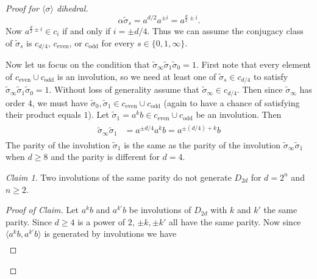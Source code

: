 \documentclass{dcthesis}
\newcommand{\wt}[1]{\widetilde{#1}}
\numberwithin{equation}{section}
\theoremstyle{definition}
\theoremstyle{remark}
\newtheorem*{claim}{Claim}
\begin{document}
{{\begin{proof}[Proof for $\langle\sigma\rangle$ dihedral]
\begin{equation}
        \alpha\wt{\sigma}_s
        =a^{d/2}a^{\pm i}=a^{\frac{d}{2}\pm i}.
      \end{equation}
      Now $a^{\frac{d}{2}\pm i}\in c_i$
      if and only if
      $i=\pm d/4$.
      Thus we can assume the conjugacy class of
      $\wt{\sigma}_s$
      is $c_{d/4}$,
      $c_\text{even}$, or
      $c_\text{odd}$
      for every $s\in \{0,1,\infty\}$.
      \par
      Now let us focus on the condition that
      $\wt{\sigma}_\infty\wt{\sigma}_1
      \wt{\sigma}_0=1$.
      First note that
      every element of
      $c_\text{even}\cup c_\text{odd}$
      is an involution, so we need
      at least one of $\wt{\sigma}_s\in c_{d/4}$
      to satisfy
      $\wt{\sigma}_\infty\wt{\sigma}_1
      \wt{\sigma}_0=1$.
      Without loss of generality
      assume that
      $\wt{\sigma}_\infty\in c_{d/4}$.
      Then since $\wt{\sigma}_\infty$ has order $4$,
      we must have
      $\wt{\sigma}_0,\wt{\sigma}_1
      \in c_\text{even}\cup c_\text{odd}$
      (again to have a chance of satisfying
      their product equals $1$).
      Let $\wt{\sigma}_1
      = a^kb
      \in c_\text{even}\cup
      c_\text{odd}$ be an involution.
      Then
      \begin{align}
        \label{eqn:sigma1sigmaoo}
        \begin{split}
          \wt{\sigma}_\infty\wt{\sigma}_1
          &= a^{\pm d/4}a^kb
          = a^{\pm (d/4)+k}b
        \end{split}
      \end{align}
      The parity
      of the involution $\wt{\sigma}_1$
      is the same as the
      parity of the involution
      $\wt{\sigma}_\infty\wt{\sigma}_1$
      when $d\geq 8$
      and the parity is different for $d=4$.
      \begin{claim}
        \label{claim:sameparitydoesnotgenerate}
        Two involutions of the same parity
        do not generate $D_{2d}$ for $d=2^n$
        and $n\geq 2$.
      \end{claim}
      \begin{proof}[Proof of Claim]
        Let $a^kb$ and $a^{k'}b$ be involutions
        of $D_{2d}$ with $k$ and $k'$ the same
        parity.
        Since $d\geq 4$ is a power of $2$,
        $\pm k, \pm k'$ all have the same parity.
        Now since
        $\langle a^kb,a^{k'}b\rangle$
        is generated by involutions
        we have
        \begin{align}

\end{align}
\end{proof}
\end{proof}}}
\end{document}
